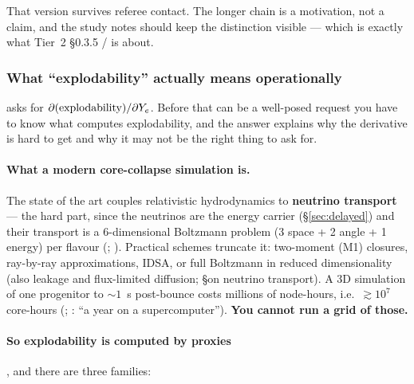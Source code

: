 That version survives referee contact. The longer chain is a motivation, not a
claim, and the study notes should keep the distinction visible --- which is
exactly what Tier~2 \S 0.3.5 /  is about.

\subsubsection{What ``explodability'' actually means operationally}
\label{sec:explodability}

 asks for $\partial(\text{explodability})/\partial Y_{e}$. Before that
can be a well-posed request you have to know what computes explodability, and
the answer explains why the derivative is hard to get and why it may not be the
right thing to ask for.

\paragraph{What a modern core-collapse simulation is.} The state of the art
couples relativistic hydrodynamics to \textbf{neutrino transport} --- the hard
part, since the neutrinos are the energy carrier (\S\ref{sec:delayed}) and
their transport is a 6-dimensional Boltzmann problem (3 space + 2 angle + 1
energy) per flavour (\citealt{muller2016a}; \citealt{couch2020}). Practical
schemes truncate it: two-moment (M1) closures, ray-by-ray approximations, IDSA,
or full Boltzmann in reduced dimensionality (also leakage and flux-limited
diffusion; \citealt{muller2016a} \S on neutrino transport). A 3D simulation of
one progenitor to $\sim 1$~s post-bounce costs millions of node-hours, i.e.\
$\gtrsim 10^7$ core-hours (\citealt{couch2020}; \citealt{burrows2021}: ``a year
on a supercomputer''). \textbf{You cannot run a grid of those.}

\paragraph{So explodability is computed by proxies}, and there are three
families:

